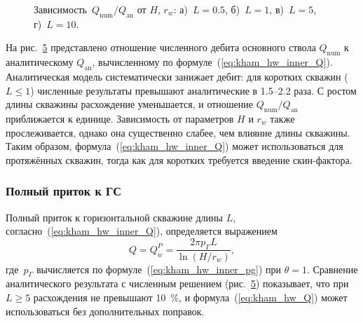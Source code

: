 \documentclass{article}
\begin{document}
\begin{figure}[H]
	\centering
	\begin{subfigure}{0.48\textwidth}
		
		\caption{}
		\label{fig:kham_hw_pipe_edge_effect_L0.5_mrst}
	\end{subfigure}
	\hfill
	\begin{subfigure}{0.48\textwidth}
		
		\caption{}
		\label{fig:kham_hw_pipe_edge_effect_L1_mrst}
	\end{subfigure}

	\begin{subfigure}{0.48\textwidth}
		
		\caption{}
		\label{fig:kham_hw_pipe_edge_effect_L5_mrst}
	\end{subfigure}
	\hfill
	\begin{subfigure}{0.48\textwidth}
		
		\caption{}
		\label{fig:kham_hw_pipe_edge_effect_L10_mrst}
	\end{subfigure}

	\caption{
		Зависимость~$Q_{\text{num}} / Q_{\text{an}}$ от $H$, $r_w$: а)~$L=0.5$, б)~$L=1$, в)~$L=5$, г)~$L=10$.
	}
	\label{fig:kham_hw_pipe_edge_effects_mrst}
\end{figure}

На рис.~\ref{fig:kham_hw_pipe_edge_effects_mrst} представлено отношение численного дебита
основного ствола $Q_{\text{num}}$ к аналитическому $Q_{\text{an}}$, вычисленному по формуле~(\ref{eq:kham_hw_inner_Q}).
Аналитическая модель систематически занижает дебит: для коротких скважин ($L \leq 1$) численные результаты
превышают аналитические в 1.5--2.2 раза. С ростом длины скважины расхождение уменьшается, и
отношение $Q_{\text{num}}/Q_{\text{an}}$ приближается к единице.
Зависимость от параметров $H$ и $r_w$ также прослеживается, однако она существенно слабее,
чем влияние длины скважины. Таким образом, формула~(\ref{eq:kham_hw_inner_Q})
может использоваться для протяжённых скважин, тогда как для коротких требуется введение скин-фактора.

\subsubsection{Полный приток к ГС}

Полный приток к горизонтальной скважине длины $L$, согласно~(\ref{eq:kham_hw_inner_Q}), определяется выражением
\begin{equation}
	\displaystyle
	Q = Q_w^P = \dfrac{2 \pi p_{\Gamma} L}{\ln \left( H / r_w \right)},
	\label{eq:kham_hw_Q}
\end{equation}
где~$p_{\Gamma}$ вычисляется по формуле~(\ref{eq:kham_hw_inner_pg}) при $\theta=1$.
Сравнение аналитического результата с численным решением (рис.~\ref{fig:kham_hw_pipe_edge_effects_mrst})
показывает, что при $L \geq 5$ расхождения не превышают 10~\%, и формула~(\ref{eq:kham_hw_Q})
может использоваться без дополнительных поправок.
\end{document}
